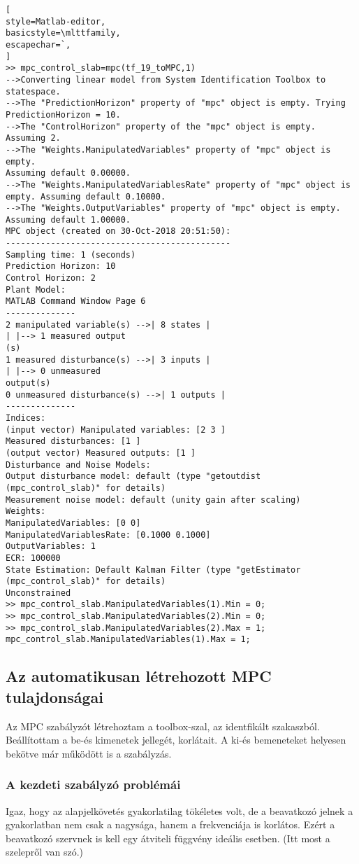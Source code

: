 \begin{lstlisting}[
style=Matlab-editor,
basicstyle=\mlttfamily,
escapechar=`,
]
>> mpc_control_slab=mpc(tf_19_toMPC,1)
-->Converting linear model from System Identification Toolbox to statespace.
-->The "PredictionHorizon" property of "mpc" object is empty. Trying
PredictionHorizon = 10.
-->The "ControlHorizon" property of the "mpc" object is empty. Assuming 2.
-->The "Weights.ManipulatedVariables" property of "mpc" object is empty.
Assuming default 0.00000.
-->The "Weights.ManipulatedVariablesRate" property of "mpc" object is
empty. Assuming default 0.10000.
-->The "Weights.OutputVariables" property of "mpc" object is empty.
Assuming default 1.00000.
MPC object (created on 30-Oct-2018 20:51:50):
---------------------------------------------
Sampling time: 1 (seconds)
Prediction Horizon: 10
Control Horizon: 2
Plant Model: 
MATLAB Command Window Page 6
--------------
2 manipulated variable(s) -->| 8 states |
| |--> 1 measured output
(s)
1 measured disturbance(s) -->| 3 inputs |
| |--> 0 unmeasured
output(s)
0 unmeasured disturbance(s) -->| 1 outputs |
--------------
Indices:
(input vector) Manipulated variables: [2 3 ]
Measured disturbances: [1 ]
(output vector) Measured outputs: [1 ]
Disturbance and Noise Models:
Output disturbance model: default (type "getoutdist
(mpc_control_slab)" for details)
Measurement noise model: default (unity gain after scaling)
Weights:
ManipulatedVariables: [0 0]
ManipulatedVariablesRate: [0.1000 0.1000]
OutputVariables: 1
ECR: 100000
State Estimation: Default Kalman Filter (type "getEstimator
(mpc_control_slab)" for details)
Unconstrained
>> mpc_control_slab.ManipulatedVariables(1).Min = 0;
>> mpc_control_slab.ManipulatedVariables(2).Min = 0;
>> mpc_control_slab.ManipulatedVariables(2).Max = 1;
mpc_control_slab.ManipulatedVariables(1).Max = 1;

\end{lstlisting}


\subsection{Az automatikusan létrehozott MPC tulajdonságai}

Az MPC szabályzót létrehoztam a toolbox-szal, az identfikált szakaszból. Beállítottam a be-és kimenetek jellegét, korlátait. A ki-és bemeneteket helyesen bekötve már működött is a szabályzás.



\subsubsection{A kezdeti szabályzó problémái}
Igaz, hogy az alapjelkövetés gyakorlatilag tökéletes volt, de a beavatkozó jelnek a gyakorlatban nem csak a nagysága, hanem a frekvenciája is korlátos. Ezért a beavatkozó szervnek is kell egy átviteli függvény ideális esetben. (Itt most a szelepről van szó.)

